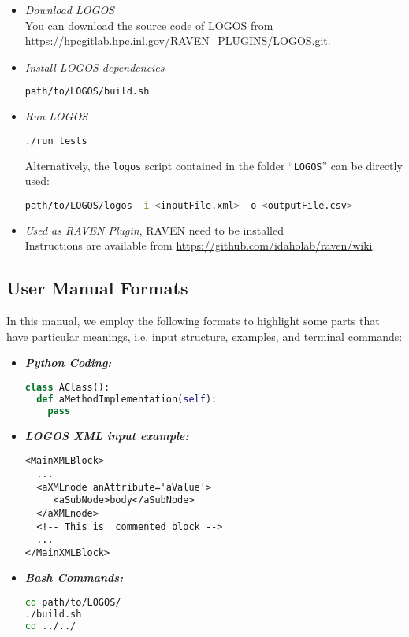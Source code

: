 \begin{itemize}
  \item \textit{Download LOGOS}
    \\ You can download the source code of LOGOS from \url{https://hpcgitlab.hpc.inl.gov/RAVEN_PLUGINS/LOGOS.git}.
  \item \textit{Install LOGOS dependencies}
	\begin{lstlisting}[language=bash]
	path/to/LOGOS/build.sh
	\end{lstlisting}
  \item \textit{Run LOGOS}
	\begin{lstlisting}[language=bash]
	./run_tests
	\end{lstlisting}
  	Alternatively, the \texttt{logos} script
    contained in the folder ``\texttt{LOGOS}'' can be directly used:
\begin{lstlisting}[language=bash]
path/to/LOGOS/logos -i <inputFile.xml> -o <outputFile.csv>
\end{lstlisting}
	\item \textit{Used as RAVEN Plugin}, RAVEN need to be installed
		\\ Instructions are available from \url{https://github.com/idaholab/raven/wiki}.
\end{itemize}

\subsection{User Manual Formats}
In this manual, we employ the following formats to highlight some parts that have
particular meanings, i.e. input structure, examples, and terminal commands:

\begin{itemize}
\item \textbf{\textit{Python Coding:}}
\begin{lstlisting}[language=python]
class AClass():
  def aMethodImplementation(self):
    pass
\end{lstlisting}
\item \textbf{\textit{LOGOS XML input example:}}
\begin{lstlisting}[style=XML,morekeywords={anAttribute}]
<MainXMLBlock>
  ...
  <aXMLnode anAttribute='aValue'>
     <aSubNode>body</aSubNode>
  </aXMLnode>
  <!-- This is  commented block -->
  ...
</MainXMLBlock>
\end{lstlisting}
\item \textbf{\textit{Bash Commands:}}
\begin{lstlisting}[language=bash]
cd path/to/LOGOS/
./build.sh
cd ../../
\end{lstlisting}
\end{itemize}

